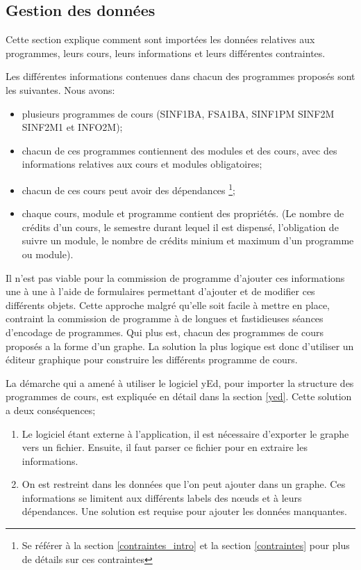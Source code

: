 \subsection{Gestion des données}
\label{data_mgmt}
Cette section explique comment sont importées les données relatives aux programmes, leurs cours, leurs informations et leurs différentes contraintes. 

Les différentes informations contenues dans chacun des programmes proposés sont les suivantes. Nous avons:
\begin{itemize}
\item plusieurs programmes de cours (SINF1BA, FSA1BA, SINF1PM SINF2M SINF2M1 et INFO2M);
\item chacun de ces programmes contiennent des modules et des cours, avec des informations relatives aux cours et modules obligatoires;
\item chacun de ces cours peut avoir des dépendances \footnote{Se référer à la section \ref{contraintes_intro} et la section \ref{contraintes} pour plus de détails sur ces contraintes};
\item chaque cours, module et programme contient des propriétés. (Le nombre de crédits d'un cours, le semestre durant lequel il est dispensé, l'obligation de suivre un module, le nombre de crédits minium et maximum d'un programme ou module).
\end{itemize}

Il n'est pas viable pour la commission de programme d'ajouter ces informations une à une à l'aide de formulaires permettant d'ajouter et de modifier ces différents objets. Cette approche malgré qu'elle soit facile à mettre en place, contraint la commission de programme à de longues et fastidieuses séances d'encodage de programmes. Qui plus est, chacun des programmes de cours proposés a la forme d'un graphe. La solution la plus logique est donc d'utiliser un éditeur graphique pour construire les différents programme de cours.

La démarche qui a amené à utiliser le logiciel yEd, pour importer la structure des programmes de cours, est expliquée en détail dans la section \ref{yed}. Cette solution a deux conséquences;

\begin{enumerate}
  \item Le logiciel étant externe à l'application, il est nécessaire d'exporter le graphe vers un fichier. Ensuite, il faut parser ce fichier pour en extraire les informations.
  \item On est restreint dans les données que l'on peut ajouter dans un graphe. Ces informations se limitent aux différents labels des nœuds et à leurs dépendances. Une solution est requise pour ajouter les données manquantes. 
\end{enumerate}

